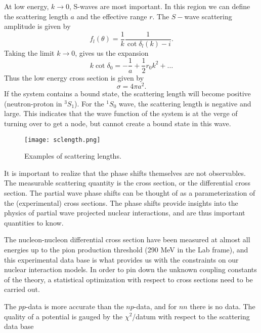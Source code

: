 \documentclass[graybox,sectrefs,envcountresetchap,open=right]{svmonodo}
\begin{document}
At low energy, $k \rightarrow 0$, S-waves are most important. In this region we can define the scattering length $a$ and the effective range $r$. The $S-$wave scattering amplitude is given by
\[
f_l(\theta) = \frac{1}{k}\frac{1}{\cot \delta_l(k) - i}.
\]
Taking the limit $k \rightarrow 0$, gives us the expansion
\[
k \cot \delta_0 = -\frac{1}{a} + \frac{1}{2}r_0 k^2 + \ldots
\]
Thus the low energy cross section is given by
\[
\sigma = 4\pi a^2.
\]
If the system contains a bound state, the scattering length will become positive (neutron-proton in $^3S_1$). For the $^1S_0$ wave, the scattering length is negative and large. This indicates that the wave function of the system is at the verge of turning over to get a node, but cannot create a bound state in this wave.

\begin{figure}[t]
  \centerline{\texttt{[image: sclength.png]}}
  
    \vspace{.5cm}
  \caption{
  Examples of scattering lengths.
  }
\end{figure}

It is important to realize that the phase shifts themselves are not
observables. The measurable scattering quantity is the cross section,
or the differential cross section. The partial wave phase shifts can
be thought of as a parameterization of the (experimental) cross
sections. The phase shifts provide insights into the physics of
partial wave projected nuclear interactions, and are thus important
quantities to know.

The nucleon-nucleon differential cross section
have been measured at almost all energies up to the pion production
threshold (290 MeV in the Lab frame), and this experimental data base
is what provides us with the constraints on our nuclear interaction
models. In order to pin down the unknown coupling constants of the
theory, a statistical optimization with respect to cross sections need
to be carried out. 


The $pp$-data is more accurate than the $np$-data, and for $nn$ there is no data. The quality of a potential is gauged by the $\chi^2$/datum with respect to the scattering data base
\end{document}
